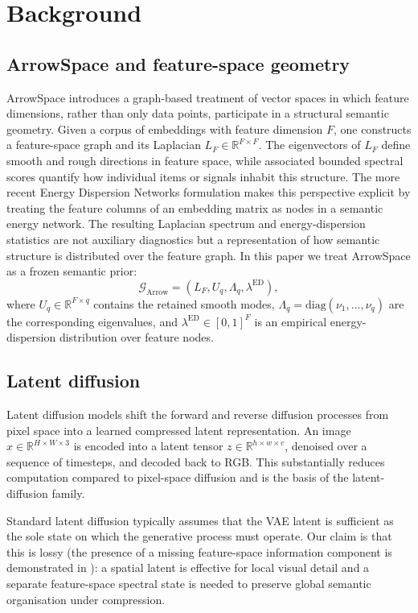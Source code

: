 \documentclass[11pt]{article}
\newcommand{\Lf}{L_F}
\newcommand{\Uq}{U_q}
\newcommand{\Lq}{\Lambda_q}
\newcommand{\ed}{\lambda^{\mathrm{ED}}}
\newcommand{\R}{\mathbb{R}}
\begin{document}
    \section{Background}
    \label{sec:background}
    
    \subsection{ArrowSpace and feature-space geometry}
    \label{sec:arrowspace} 
    ArrowSpace introduces a graph-based treatment of vector spaces in which feature dimensions, rather than only data points, participate in a structural semantic geometry. Given a corpus of embeddings with feature dimension $F$, one constructs a feature-space graph and its Laplacian $\Lf \in \R^{F \times F}$. The eigenvectors of $\Lf$ define smooth and rough directions in feature space, while associated bounded spectral scores quantify how individual items or signals inhabit this structure.  The more recent Energy Dispersion Networks formulation \cite{MoriondoAzizi2026} makes this perspective explicit by treating the feature columns of an embedding matrix as nodes in a semantic energy network. The resulting Laplacian spectrum and energy-dispersion statistics are not auxiliary diagnostics but a representation of how semantic structure is distributed over the feature graph.  In this paper we treat ArrowSpace as a frozen semantic prior: \[ \mathcal{G}_{\mathrm{Arrow}} = (\Lf,\Uq,\Lq,\ed),\] where $\Uq \in \R^{F \times q}$ contains the retained smooth modes, $\Lq = \mathrm{diag}(\nu_1,\ldots,\nu_q)$ are the corresponding eigenvalues, and $\ed \in [0,1]^F$ is an empirical energy-dispersion distribution over feature nodes.

\subsection{Latent diffusion}
\label{sec:latent_diffusion}

Latent diffusion models shift the forward and reverse diffusion processes from
pixel space into a learned compressed latent representation. An image
$x \in \R^{H \times W \times 3}$ is encoded into a latent tensor
$z \in \R^{h \times w \times c}$, denoised over a sequence of timesteps,
and decoded back to RGB. This substantially reduces computation compared to
pixel-space diffusion and is the basis of the latent-diffusion family.

Standard latent diffusion typically assumes that the VAE latent is sufficient
as the sole state on which the generative process must operate. Our claim is
that this is lossy (the presence of a missing feature-space information component is demonstrated in \cite{MoriondoAzizi2026}): a spatial latent is effective for local visual detail and a separate feature-space spectral state is needed to preserve global
semantic organisation under compression.
\end{document}
